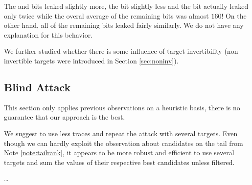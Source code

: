 	The  and  bits leaked slightly more, the  bit slightly less and the  bit actually leaked only twice while the overal average of the remaining bits was almost $160$! On the other hand, all of the remaining bits leaked fairly similarly. We do not have any explanation for this behavior.
	
	We further studied whether there is some influence of target invertibility (non-invertible targets were introduced in Section \ref{sec:noninv}).
	



\subsection{Blind Attack}
\label{sec:subblindattack}

\begin{note}
	This section only applies previous observations on a heuristic basis, there is no guarantee that our approach is the best.
\end{note}

We suggest to use less traces and repeat the attack with several targets. Even though we can hardly exploit the observation about candidates on the tail from Note \ref{note:tailrank}, it appears to be more robust and efficient to use several targets and sum the values of their respective best candidates unless filtered.

\ldots




